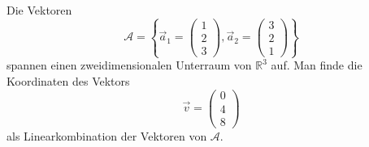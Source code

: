 \begin{beispiel}
Die Vektoren \[
\mathcal{A}=\left\{
\vec{a}_1=
\begin{pmatrix}1\\2\\3\end{pmatrix},
\vec{a}_2=
\begin{pmatrix}3\\2\\1\end{pmatrix}
\right\}
\]
spannen einen zweidimensionalen Unterraum von $\mathbb R^3$ auf.
Man finde
die Koordinaten des Vektors
\[
\vec{v}
=
\begin{pmatrix}
0\\4\\8
\end{pmatrix}
\]
als Linearkombination der Vektoren von $\mathcal{A}$.


\end{beispiel}
